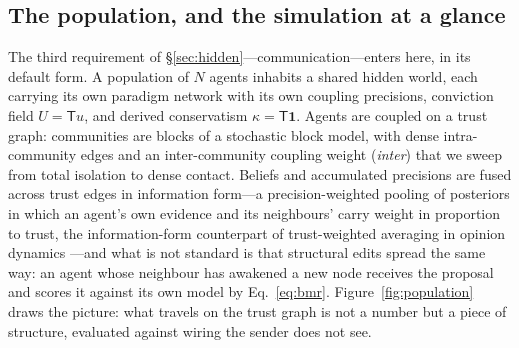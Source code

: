 \documentclass[runningheads]{llncs}
\newcommand{\Top}{\mathsf{T}}          %
\newcommand{\bone}{\mathbf{1}}         %
\begin{document}
\subsection{The population, and the simulation at a glance}
\label{sec:model}

The third requirement of \S\ref{sec:hidden}---communication---enters here, in its default form.
A population of $N$ agents inhabits a shared hidden world, each carrying its own paradigm network
with its own coupling precisions, conviction field $U=\Top u$, and derived conservatism
$\kappa=\Top\bone$. Agents are coupled on a trust graph: communities are blocks of a stochastic block
model, with dense intra-community edges and an inter-community coupling weight (\emph{inter}) that we
sweep from total isolation to dense contact. Beliefs and accumulated precisions are fused across
trust edges in information form---a precision-weighted pooling of posteriors in which an agent's own
evidence and its neighbours' carry weight in proportion to trust, the information-form counterpart
of trust-weighted averaging in opinion dynamics \citep{degroot1974,acemoglu2011}---and what is not
standard is that structural edits spread the same way: an agent whose neighbour has awakened a new node receives the proposal and scores it
against its own model by Eq.~\eqref{eq:bmr}. Figure~\ref{fig:population} draws the picture: what
travels on the trust graph is not a number but a piece of structure, evaluated against wiring the
sender does not see.
\end{document}

